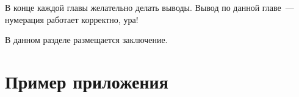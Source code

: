 \documentclass[times
              ]{itmo-student-thesis}
\begin{document}
  \chapterconclusion %

    В конце каждой главы желательно делать выводы. Вывод по данной главе~--- нумерация работает корректно, ура!

\startconclusionpage

В данном разделе размещается заключение.

\printmainbibliography

\appendix

\chapter{Пример приложения}\label{sec:app:1}
\end{document}
